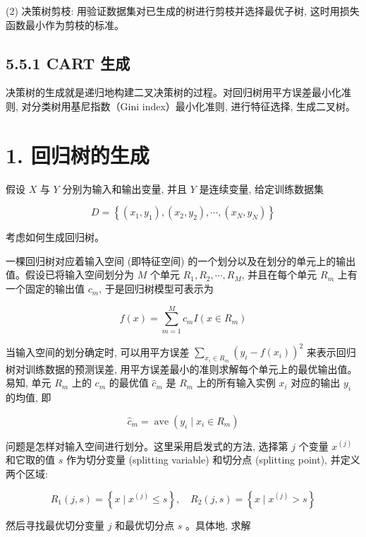 \documentclass[10pt]{article}
\begin{document}
\begin{CJK*}{UTF8}{bsmi}
(2) 决策树剪枝: 用验证数据集对已生成的树进行剪枝并选择最优子树, 这时用损失函数最小作为剪枝的标准。

\subsection*{5.5.1 CART 生成}
决策树的生成就是递归地构建二叉决策树的过程。对回归树用平方误差最小化准则, 对分类树用基尼指数（Gini index）最小化准则, 进行特征选择, 生成二叉树。

\section*{1. 回归树的生成}
假设 $X$ 与 $Y$ 分别为输入和输出变量, 并且 $Y$ 是连续变量, 给定训练数据集

$$
D=\left\{\left(x_{1}, y_{1}\right),\left(x_{2}, y_{2}\right), \cdots,\left(x_{N}, y_{N}\right)\right\}
$$

考虑如何生成回归树。

一棵回归树对应着输入空间 (即特征空间) 的一个划分以及在划分的单元上的输出值。假设已将输入空间划分为 $M$ 个单元 $R_{1}, R_{2}, \cdots, R_{M}$, 并且在每个单元 $R_{m}$ 上有一个固定的输出值 $c_{m}$, 于是回归树模型可表示为


\begin{equation*}
f(x)=\sum_{m=1}^{M} c_{m} I\left(x \in R_{m}\right) \tag{5.16}
\end{equation*}


当输入空间的划分确定时, 可以用平方误差 $\sum_{x_{i} \in R_{m}}\left(y_{i}-f\left(x_{i}\right)\right)^{2}$ 来表示回归树对训练数据的预测误差, 用平方误差最小的准则求解每个单元上的最优输出值。易知, 单元 $R_{m}$ 上的 $c_{m}$ 的最优值 $\hat{c}_{m}$ 是 $R_{m}$ 上的所有输入实例 $x_{i}$ 对应的输出 $y_{i}$ 的均值, 即


\begin{equation*}
\hat{c}_{m}=\operatorname{ave}\left(y_{i} \mid x_{i} \in R_{m}\right) \tag{5.17}
\end{equation*}


问题是怎样对输入空间进行划分。这里采用启发式的方法, 选择第 $j$ 个变量 $x^{(j)}$ 和它取的值 $s$ 作为切分变量 (splitting variable) 和切分点 (splitting point), 并定义两个区域:


\begin{equation*}
R_{1}(j, s)=\left\{x \mid x^{(j)} \leqslant s\right\}, \quad R_{2}(j, s)=\left\{x \mid x^{(j)}>s\right\} \tag{5.18}
\end{equation*}


然后寻找最优切分变量 $j$ 和最优切分点 $s$ 。具体地, 求解



\end{CJK*}
\end{document}
